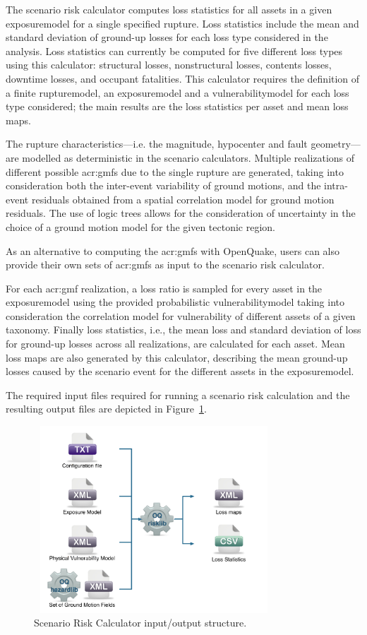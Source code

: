 The scenario risk calculator computes loss statistics for all \glspl{asset} in
a given \gls{exposuremodel} for a single specified \gls{rupture}.
Loss statistics include the mean and standard deviation of ground-up losses
for each loss type considered in the analysis. Loss
statistics can currently be computed for five different loss types using this
calculator: structural losses, nonstructural losses, contents losses, downtime
losses, and occupant fatalities. This calculator requires the definition of a
finite \gls{rupturemodel}, an \gls{exposuremodel} and a
\gls{vulnerabilitymodel} for each loss type considered; the main results are
the loss statistics per \gls{asset} and mean loss maps.

The \gls{rupture} characteristics---i.e. the magnitude, hypocenter and fault
geometry---are modelled as deterministic in the scenario calculators. Multiple
realizations of different possible \glspl{acr:gmf} due to the single
\gls{rupture} are generated, taking into consideration both the inter-event
variability of ground motions, and the intra-event residuals obtained from a
spatial correlation model for ground motion residuals. The use of logic trees
allows for the consideration of uncertainty in the choice of a ground motion
model for the given tectonic region.

As an alternative to computing the \glspl{acr:gmf} with OpenQuake, users can
also provide their own sets of \glspl{acr:gmf} as input to the scenario risk
calculator.

For each \gls{acr:gmf} realization, a loss ratio is sampled for every asset in
the \gls{exposuremodel} using the provided probabilistic
\gls{vulnerabilitymodel} taking into consideration the correlation model for
vulnerability of different \glspl{asset} of a given taxonomy. Finally loss
statistics, i.e., the mean loss and standard deviation of loss for
ground-up losses across all realizations, are calculated
for each \gls{asset}. Mean loss maps are also generated by this calculator,
describing the mean ground-up losses caused by the
scenario event for the different assets in the \gls{exposuremodel}.

The required input files required for running a scenario risk calculation and
the resulting output files are depicted in Figure~\ref{fig:io-structure-scenario-risk}.

\begin{figure}[ht]
\centering
\includegraphics[width=9cm,height=7cm]{figures/risk/io-structure-scenario-risk.pdf}
\caption{Scenario Risk Calculator input/output structure.}
\label{fig:io-structure-scenario-risk}
\end{figure}

